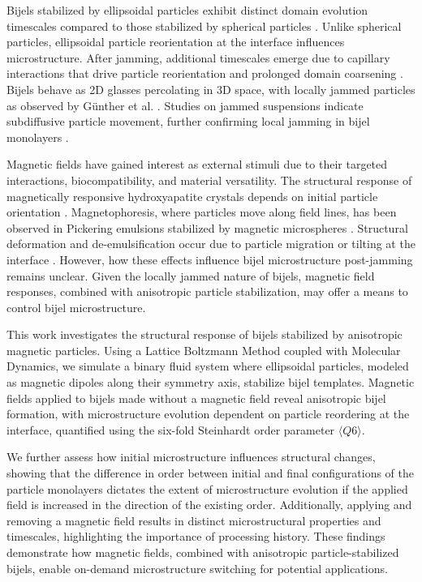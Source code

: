Bijels stabilized by ellipsoidal particles exhibit distinct domain evolution timescales compared to those stabilized by 
spherical particles \cite{gunther_timescales_2014}. Unlike spherical particles, ellipsoidal particle reorientation at the 
interface influences microstructure. After jamming, additional timescales emerge due to capillary interactions that drive 
particle reorientation and prolonged domain coarsening \cite{gunther_timescales_2014}. Bijels behave as 2D glasses percolating 
in 3D space, with locally jammed particles as observed by Günther et al. 
\cite{ching_bijel_2022, torquato_jammed_2010, gunther_timescales_2014}. Studies on jammed suspensions indicate subdiffusive 
particle movement, further confirming local jamming in bijel monolayers \cite{savelev_diffusion_2006}.

Magnetic fields have gained interest as external stimuli due to their targeted interactions, biocompatibility, and material 
versatility. The structural response of magnetically responsive hydroxyapatite crystals depends on initial particle orientation
\cite{nakayama_stimuli-responsive_2018}. Magnetophoresis, where particles move along field lines, has been observed in Pickering 
emulsions stabilized by magnetic microspheres \cite{tham_magnetophoresis_2021}. Structural deformation and de-emulsification occur due 
to particle migration or tilting at the interface \cite{yang_rapid_2020, misra_magnetic_2020}. However, how these effects influence 
bijel microstructure post-jamming remains unclear. Given the locally jammed nature of bijels, magnetic field responses, combined with 
anisotropic particle stabilization, may offer a means to control bijel microstructure.

This work investigates the structural response of bijels stabilized by anisotropic magnetic particles. Using a Lattice Boltzmann Method 
coupled with Molecular Dynamics, we simulate a binary fluid system where ellipsoidal particles, modeled as magnetic dipoles along their 
symmetry axis, stabilize bijel templates. Magnetic fields applied to bijels made without a magnetic field reveal anisotropic bijel formation, 
with microstructure evolution dependent on particle reordering at the interface, quantified using the six-fold 
Steinhardt order parameter $\langle Q6 \rangle$.

We further assess how initial microstructure influences structural changes, showing that the difference in order between initial and final 
configurations of the particle monolayers dictates the extent of microstructure evolution if the applied field is increased in the direction of 
the existing order. Additionally, applying and removing a 
magnetic field results in distinct microstructural properties and timescales, highlighting the importance of processing history. These findings 
demonstrate how magnetic fields, combined with anisotropic particle-stabilized bijels, enable on-demand microstructure switching for potential applications.


